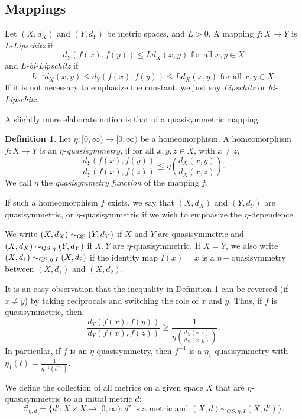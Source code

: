 \documentclass{amsart}
\theoremstyle{plain}
\theoremstyle{definition}
\newtheorem{definition}[theorem]{Definition}
\numberwithin{equation}{section}
\numberwithin{theorem}{section}
\newcommand{\cC}{\mathcal{C}}
\newcommand{\QS}{\textnormal{QS}}
\begin{document}
\subsection{Mappings}
Let $(X,d_X)$ and $(Y,d_Y)$ be metric spaces, and $L>0$. A  mapping $f:X\rightarrow Y$ is $L$-\emph{Lipschitz} if 
$$ d_Y(f(x),f(y))\leq Ld_X(x,y) \text{ for all } x,y\in X$$
and $L$-\emph{bi-Lipschitz} if 
$$ L^{-1} d_X(x,y) \leq d_Y(f(x),f(y))\leq Ld_X(x,y) \text{ for all } x,y\in X.$$ If it is not necessary to emphasize the constant, we just say \emph{Lipschitz} or \emph{bi-Lipschitz}.

A slightly more elaborate notion is that of a quasisymmetric mapping.
\begin{definition}\label{def:quasisym} Let $\eta:[0,\infty)\to [0,\infty)$ be a homeomorphism.
    A homeomorphism $f\colon X\to Y$ is an \emph{$\eta$-quasisymmetry}, if for all $x,y,z\in X$, with $x\neq z$, 
    \[
    \frac{d_Y(f(x),f(y))}{d_Y(f(x),f(z))} \leq \eta \left(\frac{d_X(x,y)}{d_X(x,z)}\right).
    \]
    We call $\eta$ the \emph{quasisymmetry function} of the mapping $f$.
     
    If such a homeomorphism $f$ exists, we say that $(X,d_X)$ and $(Y,d_Y)$ are quasisymmetric, or $\eta$-quasisymmetric if we wish to emphasize the $\eta$-dependence.
\end{definition}
We write $(X,d_X)\sim_{\QS} (Y,d_Y)$ if $X$ and $Y$ are quasisymmetric and $(X,d_X)\sim_{\QS,\eta} (Y,d_Y)$ if $X,Y$ are $\eta$-quasisymmetric. If $X=Y$, we also write $(X,d_1)\sim_{\QS,\eta,I} (X,d_2)$ if the identity map $I(x)=x$ is a $\eta-$quasisymmetry between $(X,d_1)$ and $(X,d_2)$.

It is an easy observation that the inequality in Definition \ref{def:quasisym} can be reversed (if $x\neq y$) by taking reciprocals and switching the role of $x$ and $y$. Thus, if $f$ is quasisymmetric, then
\begin{equation}\label{eq:invquas}
    \frac{d_Y(f(x),f(y))}{d_Y(f(x),f(z))} \geq \frac{1}{\eta \left(\frac{d_X(x,z)}{d_X(x,y)}\right)}.
\end{equation}
In particular, if $f$ is an $\eta$-quasisymmetry, then $f^{-1}$ is a $\eta_1$-quasisymmetry with $\eta_1(t)=\frac{1}{\eta^{-1}(t^{-1})}$.


We define the collection of all metrics on a given space $X$ that are $\eta$-quasisymmetric to an initial metric $d$:
\[
\cC_{\eta,d} = \{d':X\times X \to [0,\infty) : d' \text{ is a metric and } (X,d) \sim_{QS,\eta,I} (X,d')\}.
\]
\end{document}
